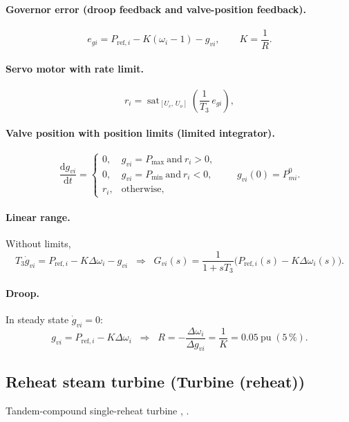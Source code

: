 \documentclass[11pt,a4paper]{article}
\numberwithin{equation}{section}
\newcommand{\sat}{\operatorname{sat}}
\newcommand{\dd}{\mathrm{d}}
\newcommand{\blk}[1]{\textsf{#1}}
\begin{document}
\paragraph{Governor error (droop feedback and valve-position feedback).}
\begin{equation}
e_{gi} = P_{\text{ref},i} - K(\omega_i - 1) - g_{vi},\qquad K = \frac{1}{R} .
\end{equation}
\paragraph{Servo motor with rate limit.}
\begin{equation}
r_i = \sat_{[U_c,\,U_o]}\!\left(\frac{1}{T_3}\,e_{gi}\right),
\end{equation}
\paragraph{Valve position with position limits (limited integrator).}
\begin{equation}
\boxed{\frac{\dd g_{vi}}{\dd t} =
\begin{cases}
0, & g_{vi}=P_{\max}\ \text{and}\ r_i>0,\\
0, & g_{vi}=P_{\min}\ \text{and}\ r_i<0,\\
r_i, & \text{otherwise},
\end{cases}
\qquad g_{vi}(0)=P_{mi}^0 .}
\end{equation}
\paragraph{Linear range.} Without limits,
\begin{equation}
T_3\dot g_{vi} = P_{\text{ref},i} - K\Delta\omega_i - g_{vi}
\;\;\Longrightarrow\;\;
G_{vi}(s) = \frac{1}{1+sT_3}\big(P_{\text{ref},i}(s) - K\Delta\omega_i(s)\big).
\end{equation}
\paragraph{Droop.} In steady state $\dot g_{vi}=0$:
\begin{equation}
g_{vi} = P_{\text{ref},i} - K\Delta\omega_i
\;\;\Longrightarrow\;\;
R = -\frac{\Delta\omega_i}{\Delta g_{vi}} = \frac{1}{K} = 0.05~\text{pu}\;(5\,\%).
\end{equation}

\subsection{Reheat steam turbine (\blk{Turbine (reheat)})}
Tandem-compound single-reheat turbine \cite{IEEE1973,PESTR1}, \cite[Ch.~9]{Kundur1994}.
\end{document}
